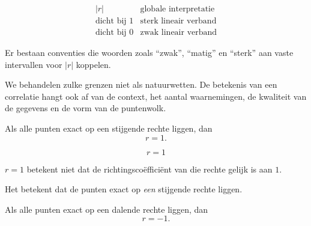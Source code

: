 \documentclass{ximera}
\begin{document}
\[
\begin{array}{c|c}
|r| & \text{globale interpretatie}\\ \hline
\text{dicht bij }1 & \text{sterk lineair verband}\\
\text{dicht bij }0 & \text{zwak lineair verband}
\end{array}
\]

\begin{opmerking}
Er bestaan conventies die woorden zoals ``zwak'', ``matig'' en
``sterk'' aan vaste intervallen voor $|r|$ koppelen.

We behandelen zulke grenzen niet als natuurwetten. De betekenis van
een correlatie hangt ook af van de context, het aantal waarnemingen,
de kwaliteit van de gegevens en de vorm van de puntenwolk.
\end{opmerking}



Als alle punten exact op een stijgende rechte liggen, dan
\[
r=1.
\]

\begin{center}

\[
r=1
\]
\end{center}

\begin{opmerking}
$r=1$ betekent niet dat de richtingscoëfficiënt van die rechte gelijk
is aan $1$.

Het betekent dat de punten exact op \emph{een} stijgende rechte liggen.
\end{opmerking}



Als alle punten exact op een dalende rechte liggen, dan
\[
r=-1.
\]
\end{document}
